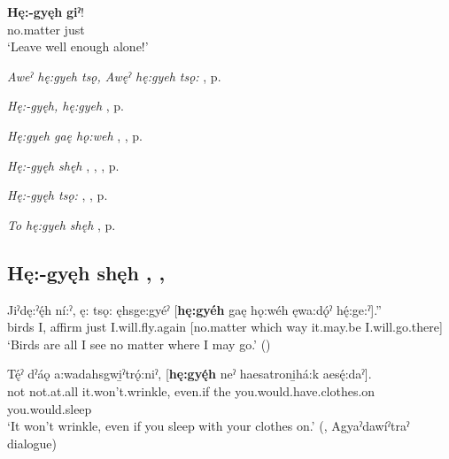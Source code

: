 \ea
\label{ex:hpar32}
\gll \textbf{Hę:-gyęh} \textbf{giˀ}!\\
no.matter just\\
\glt ‘Leave well enough alone!’
\z


\begin{CayugaRelated}
\item \textit{Aweˀ hę:gyeh tsǫ, Awęˀ hę:gyeh tsǫ:} , p. \pageref{p:[aweˀ hę:gyeh tsǫ:]}\\
\item \textit{Hę:-gyęh, hę:gyeh} , p. \pageref{p:[hę:-gyęh]}\\
\item \textit{Hę:gyeh gaę hǫ:weh} , , p. \pageref{p:[hę:-gyeh gaę hǫ:weh]}\\
\item \textit{Hę:-gyęh shęh} , , , p. \pageref{p:[hę:-gyęh shęh]}\\
\item \textit{Hę:-gyęh tsǫ:} , , p. \pageref{p:[hę:-gyęh tsǫ:]}\\
\item \textit{To hę:gyeh shęh} , p. \pageref{p:[to hę:gyeh shęh]}
\end{CayugaRelated}

\subsection*{\textbf{Hę:-gyęh shęh} , , } \label{p:[hę:-gyęh shęh]}

\ea
\label{ex:hpar33}
\gll Jiˀdę:ˀę́h ní:ˀ, ę: tsǫ: ęhsge:gyéˀ [\textbf{hę:gyéh} gaę hǫ:wéh ęwa:dǫ́ˀ hę́:ge:ˀ].”\\
birds I, affirm just I.will.fly.again [no.matter which way it.may.be I.will.go.there]\\
\glt ‘Birds are all I see no matter where I may go.’ (\cite{henry_de_2005})
\z


\ea
\label{ex:hpar34}
\gll Tę́ˀ dˀáǫ a:wadahsgwi̱ˀtrǫ́:niˀ, [\textbf{hę:gyę́h} neˀ haesatroni̱há:k aesę́:daˀ].\\
not not.at.all it.won’t.wrinkle, even.if the you.would.have.clothes.on you.would.sleep\\
\glt ‘It won’t wrinkle, even if you sleep with your clothes on.’ (\cite[225]{mithun_watewayestanih_1984}, Agyaˀdawíˀtraˀ dialogue)
\z


